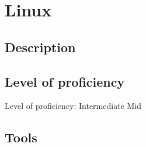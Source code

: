 \section{Linux}

\subsection{Description}

\subsection{Level of proficiency}

Level of proficiency: Intermediate Mid

\subsection{Tools}

